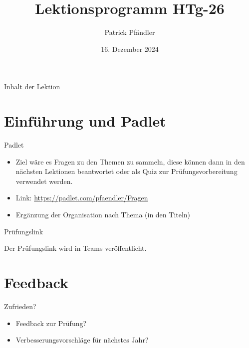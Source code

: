 



\title{\textbf{Lektionsprogramm HTg-26}}
\author{Patrick Pfändler}
\date{16. Dezember 2024}




\frame{\titlepage}

\begin{frame}{Inhalt der Lektion}
    \tableofcontents
\end{frame}


\section{Einführung und Padlet}
\BlueSectionSlide
\begin{frame}{Padlet}
\begin{itemize}
	\item[\textbullet] Ziel wäre es Fragen zu den Themen zu sammeln, diese können dann in den nächsten Lektionen beantwortet oder als Quiz zur Prüfungsvorbereitung verwendet werden.
	\item[\textbullet] Link: \url{https://padlet.com/pfaendler/Fragen}
	\item[\textbullet] Ergänzung der Organisation nach Thema (in den Titeln)
\end{itemize}
\end{frame}





\begin{frame}{Prüfungslink}
    \begin{center}
        \Huge Der Prüfungslink wird in Teams veröffentlicht.
    \end{center}

\end{frame}







\section{Feedback}
\BlueSectionSlide
\begin{frame}{Zufrieden?}
    \begin{itemize}
        \item Feedback zur Prüfung?
        \item Verbesserungsvorschläge für nächstes Jahr?
    \end{itemize}
\end{frame}

